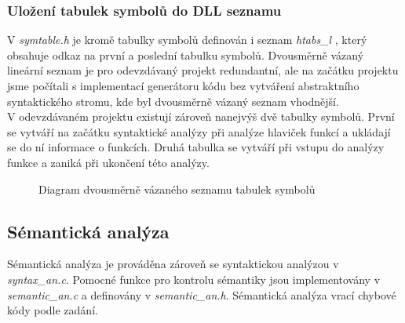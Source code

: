 \documentclass[a4paper, 12pt]{article}
\begin{document}
\newpage

\subsubsection{Uložení tabulek symbolů do DLL seznamu}
V \textit{symtable.h} je kromě tabulky symbolů definován i seznam \textit{htabs\_l }, který obsahuje odkaz na první a poslední tabulku symbolů. Dvousměrně vázaný lineární seznam je pro odevzdávaný projekt redundantní, ale na začátku projektu jsme počítali s implementací generátoru kódu bez vytváření abstraktního syntaktického stromu, kde byl dvousměrně vázaný seznam vhodnější.\\
\newline
V odevzdávaném projektu existují zároveň nanejvýš dvě tabulky symbolů. První se vytváří na začátku syntaktické analýzy při analýze hlaviček funkcí a ukládají se do ní informace o funkcích. 
\newline
Druhá tabulka se vytváří při vstupu do analýzy funkce a zaniká při ukončení této analýzy.
\vspace{4cm}

\begin{figure}[ht!]
\begin{center}


\caption{Diagram dvousměrně vázaného seznamu tabulek symbolů}
\end{center}
\end{figure}
\vspace{4cm}

\subsection{Sémantická analýza}
Sémantická analýza je prováděna zároveň se syntaktickou analýzou v \textit{syntax\_an.c}. Pomocné funkce pro kontrolu sémantiky jsou implementovány v \textit{semantic\_an.c} a definovány v \textit{semantic\_an.h}. Sémantická analýza vrací chybové kódy podle zadání.
\end{document}
